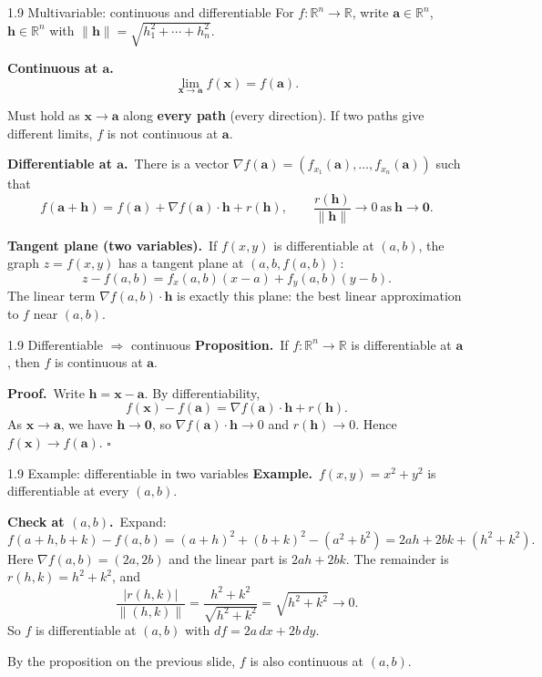 \documentclass[11pt,aspectratio=169]{beamer}
\begin{document}
\begin{frame}{1.9 Multivariable: continuous and differentiable}
  \footnotesize
  For $f\colon\mathbb{R}^n\to\mathbb{R}$, write $\mathbf{a}\in\mathbb{R}^n$,
  $\mathbf{h}\in\mathbb{R}^n$ with $\|\mathbf{h}\|=\sqrt{h_1^2+\cdots+h_n^2}$.

  \medskip
  \textbf{Continuous at $\mathbf{a}$.}
  \[
    \lim_{\mathbf{x}\to\mathbf{a}} f(\mathbf{x}) = f(\mathbf{a}).
  \]

  \medskip
  {\scriptsize Must hold as $\mathbf{x}\to\mathbf{a}$ along \textbf{every path}
  (every direction). If two paths give different limits, $f$ is not continuous at
  $\mathbf{a}$.}

  \medskip
  \textbf{Differentiable at $\mathbf{a}$.}\ There is a vector
  $\nabla f(\mathbf{a})=(f_{x_1}(\mathbf{a}),\ldots,f_{x_n}(\mathbf{a}))$ such that
  \[
    f(\mathbf{a}+\mathbf{h})
    = f(\mathbf{a}) + \nabla f(\mathbf{a})\cdot\mathbf{h} + r(\mathbf{h}),
    \qquad
    \frac{r(\mathbf{h})}{\|\mathbf{h}\|}\to 0 \ \text{as}\ \mathbf{h}\to\mathbf{0}.
  \]

  \medskip
  \textbf{Tangent plane (two variables).}\ If $f(x,y)$ is differentiable at $(a,b)$,
  the graph $z=f(x,y)$ has a tangent plane at $(a,b,f(a,b))$:
  \[
    z - f(a,b) = f_x(a,b)(x-a) + f_y(a,b)(y-b).
  \]
  {\scriptsize The linear term $\nabla f(a,b)\cdot\mathbf{h}$ is exactly this plane:
  the best linear approximation to $f$ near $(a,b)$.}
\end{frame}

\begin{frame}{1.9 Differentiable $\Rightarrow$ continuous}
  \footnotesize
  \textbf{Proposition.}\ If $f\colon\mathbb{R}^n\to\mathbb{R}$ is differentiable at
  $\mathbf{a}$, then $f$ is continuous at $\mathbf{a}$.

  \medskip
  \textbf{Proof.}\ Write $\mathbf{h}=\mathbf{x}-\mathbf{a}$. By differentiability,
  \[
    f(\mathbf{x})-f(\mathbf{a})
    = \nabla f(\mathbf{a})\cdot\mathbf{h} + r(\mathbf{h}).
  \]
  As $\mathbf{x}\to\mathbf{a}$, we have $\mathbf{h}\to\mathbf{0}$, so
  $\nabla f(\mathbf{a})\cdot\mathbf{h}\to 0$ and $r(\mathbf{h})\to 0$.
  Hence $f(\mathbf{x})\to f(\mathbf{a})$.
  \hfill$\square$
\end{frame}

\begin{frame}{1.9 Example: differentiable in two variables}
  \footnotesize
  \textbf{Example.}\ $f(x,y)=x^2+y^2$ is differentiable at every $(a,b)$.

  \medskip
  \textbf{Check at $(a,b)$.}\ Expand:
  \[
    f(a+h,b+k)-f(a,b)
    = (a+h)^2+(b+k)^2-(a^2+b^2)
    = 2ah+2bk + (h^2+k^2).
  \]
  Here $\nabla f(a,b)=(2a,2b)$ and the linear part is $2ah+2bk$.
  The remainder is $r(h,k)=h^2+k^2$, and
  \[
    \frac{|r(h,k)|}{\|(h,k)\|}
    = \frac{h^2+k^2}{\sqrt{h^2+k^2}}
    = \sqrt{h^2+k^2}\to 0.
  \]
  So $f$ is differentiable at $(a,b)$ with $df=2a\,dx+2b\,dy$.

  \medskip
  {\scriptsize By the proposition on the previous slide, $f$ is also continuous at $(a,b)$.}
\end{frame}
\end{document}
